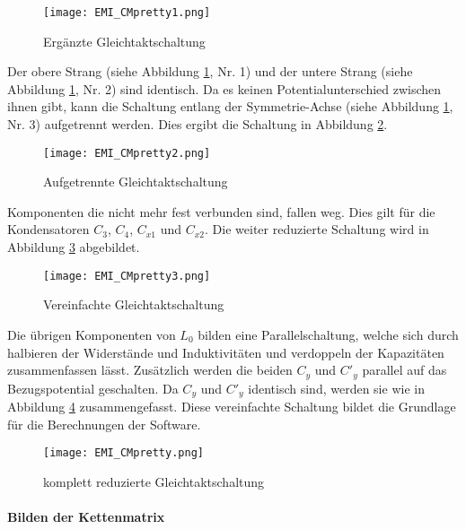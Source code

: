 \begin{figure}[H]
	\centering
	\texttt{[image: EMI\_CMpretty1.png]}
	\caption{Ergänzte Gleichtaktschaltung}
	\label{fig:CMSchaltungErgänzt}
\end{figure}

Der obere Strang (siehe Abbildung \ref{fig:CMSchaltungErgänzt}, Nr. 1) und der untere Strang (siehe Abbildung \ref{fig:CMSchaltungErgänzt}, Nr. 2) sind identisch. Da es keinen Potentialunterschied zwischen ihnen gibt, kann die Schaltung entlang der Symmetrie-Achse (siehe Abbildung \ref{fig:CMSchaltungErgänzt}, Nr. 3) aufgetrennt werden. Dies ergibt die Schaltung in Abbildung \ref{fig:CMSchaltungaufgetrennt}.

\begin{figure}[H]
	\centering
	\texttt{[image: EMI\_CMpretty2.png]}
	\caption{Aufgetrennte Gleichtaktschaltung}
	\label{fig:CMSchaltungaufgetrennt}
\end{figure}

Komponenten die nicht mehr fest verbunden sind, fallen weg. Dies gilt für die Kondensatoren $C_3$, $C_4$, $C_{x1}$ und $C_{x2}$. Die weiter reduzierte Schaltung wird in Abbildung \ref{fig:CMSchaltungvereinfacht1} abgebildet.

\begin{figure}[H]
	\centering
	\texttt{[image: EMI\_CMpretty3.png]}
	\caption{Vereinfachte Gleichtaktschaltung}
	\label{fig:CMSchaltungvereinfacht1}
\end{figure}

\newpage

Die übrigen Komponenten von $L_0$ bilden eine Parallelschaltung, welche sich durch halbieren der Widerstände und Induktivitäten und verdoppeln der Kapazitäten zusammenfassen lässt. Zusätzlich werden die beiden $C_y$ und $C'_{y}$ parallel auf das Bezugspotential geschalten. Da $C_y$ und $C'_y$ identisch sind, werden sie wie in Abbildung \ref{fig:CMSchaltungvereinfacht} zusammengefasst. Diese vereinfachte Schaltung bildet die Grundlage für die Berechnungen der Software.

\begin{figure}[H]
	\centering
	\texttt{[image: EMI\_CMpretty.png]}
	\caption{komplett reduzierte Gleichtaktschaltung}
	\label{fig:CMSchaltungvereinfacht}
\end{figure}

\paragraph{Bilden der Kettenmatrix}\label{para:kettenGleichtakt}

